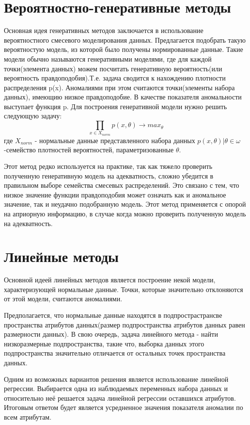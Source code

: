 \section*{Вероятностно-генеративные методы}
Основная идея генеративных методов заключается в использование вероятностного смесевого моделирования данных. Предлагается подобрать такую вероятностую модель, из которой было получены нормированные данные. Такие модели обычно называются генеративными моделями, где для каждой точки(элемента данных) можем посчитать генеративную вероятность(или вероятность правдоподобия).Т.е. задача  сводится к нахождению плотности распределения p(x). Аномалиями при этом  считаются точки(элементы набора данных), имеющию низкое правдоподобие. В качестве показателя аномальности выступает функция p.
Для построения генеративной модели нужно решить следующую задачу:
	\begingroup
	\Large
	\begin{equation*}
	\prod \limits_{x \in X_{norm}} p(x,\theta)  \rightarrow max_\theta
		\end{equation*}
	\endgroup
		где \begingroup \Large$ X_{norm}$ \endgroup - нормальные данные представленного набора данных ${p(x,\theta)|\theta \in \omega}$ -семейство плотностей вероятностей, параметризованные $\theta$.
		
Этот метод редко используется на практике, так как тяжело проверить полученную генеративную модель на адекватность, сложно  убедится в правильном выборе семейства смесевых распределений. Это связано с тем, что низкое значение функции правдоподобия может означать как и аномальное значение, так и неудачно подобранную модель. Этот метод применяется с опорой на априорную информацию, в случае когда можно проверить полученную модель на адекватность.
\section*{Линейные методы}
Основной идеей линейных методов является построение некой  модели, характеризующей нормальные данные. Точки, которые значительно отклоняются от этой модели, считаются аномалиями.

Предполагается, что нормальные данные  находятся в подпрострастрансве пространства атрибутов данных(размер подпространства атрибутов данных равен размерности данных). В свою очередь, задача линейного метода - найти низкоразмерные подпространства, такие что, выборка данных этого подпространства значительно отличается от остальных точек пространства данных.

Одним из возможных вариантов решения является использование линейной регрессии. Выбирается одна из наблюдаемых переменных  набора данных и относительно неё решается задача линейной регрессии оставшихся атрибутов. Итоговым ответом будет является усредненное значения показателя аномалии по всем атрибутам. 

